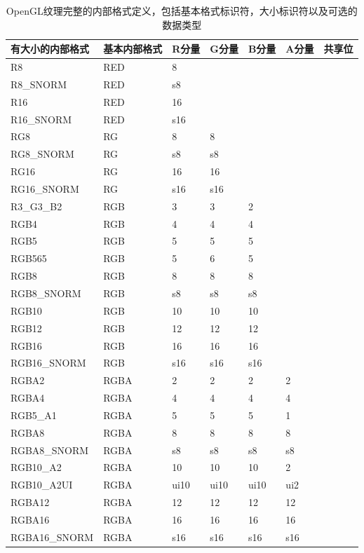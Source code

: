 \begin{longtable}{>{\small}p{}|>{\small}p{}|>{\small}p{}|>{\small}p{}|>{\small}p{}|>{\small}p{}|>{\small}p{}}
\caption{OpenGL纹理完整的内部格式定义，包括基本格式标识符，大小标识符以及可选的数据类型}
\label{t:api-texture-sized-internal-format}\\

\hline 
   有大小的内部格式 & 基本内部格式 & R分量 & G分量 & B分量 &A分量 & 共享位 \\
    \hline  
  
  R8            & RED & 8   & &  & &\\ \hline
  R8\_SNORM     & RED & s8  & &  & &\\\hline
  R16           & RED & 16  & &  & &\\\hline
  R16\_SNORM    & RED & s16 & &  & &\\\hline
  RG8           & RG  & 8   & 8  & & &\\\hline
  RG8\_SNORM    & RG  & s8  & s8 & & &\\\hline
  RG16          & RG  & 16  & 16 & & &\\\hline
  RG16\_SNORM   & RG  & s16 & s16 & & &\\\hline
  
  R3\_G3\_B2   & RGB & 3 & 3 & 2 & &\\\hline
  RGB4          & RGB & 4 & 4 & 4 & &\\\hline
  RGB5          & RGB & 5 & 5 & 5 & &\\\hline
  RGB565        & RGB & 5 & 6 & 5 & &\\\hline
  RGB8          & RGB & 8 & 8 & 8 & &\\\hline
  RGB8\_SNORM   & RGB & s8 & s8 & s8 & &\\\hline
  RGB10         & RGB & 10 & 10 & 10 & &\\\hline
  RGB12         & RGB & 12 & 12 & 12 & &\\\hline
  RGB16         & RGB & 16 & 16 & 16 & &\\\hline
  RGB16\_SNORM  & RGB & s16 & s16 & s16 & &\\\hline
  
  RGBA2         & RGBA & 2 & 2 & 2 & 2 &\\\hline
  RGBA4         & RGBA & 4 & 4 & 4 & 4 &\\\hline
  RGB5\_A1      & RGBA & 5 & 5 & 5 & 1 &\\\hline
  RGBA8         & RGBA & 8 & 8 & 8 & 8 &\\\hline
  RGBA8\_SNORM  & RGBA & s8 & s8 & s8 & s8 &\\\hline
  RGB10\_A2     & RGBA & 10 & 10 & 10 & 2  &\\\hline
  RGB10\_A2UI   & RGBA & ui10 & ui10 & ui10 & ui2 &\\\hline
  RGBA12        & RGBA & 12 & 12 & 12 & 12 &\\\hline
  RGBA16        & RGBA & 16 & 16 & 16 & 16 &\\\hline
  RGBA16\_SNORM & RGBA & s16 & s16 & s16 & s16 &\\\hline
  

\end{longtable}
